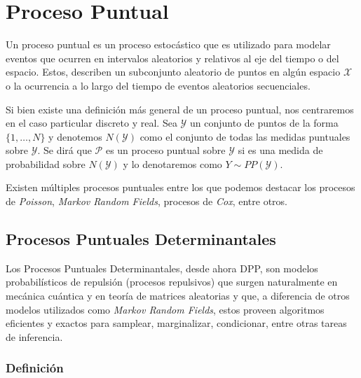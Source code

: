 \section{Proceso Puntual}

Un proceso puntual es un proceso estocástico que es utilizado para modelar eventos que ocurren en intervalos aleatorios y relativos al eje del tiempo o del espacio. Estos, describen un subconjunto aleatorio de puntos en algún espacio $\mathcal{X}$ o la ocurrencia a lo largo del tiempo de eventos aleatorios secuenciales. 

\vspace{0.2cm}

Si bien existe una definición más general de un proceso puntual, nos centraremos en el caso particular discreto y real. Sea $\mathcal{Y}$ un conjunto de puntos de la forma $\{ 1 , \dots , N \}$ y denotemos $N(\mathcal{Y})$ como el conjunto de todas las medidas puntuales sobre $\mathcal{Y}$. Se dirá que $\mathcal{P}$ es un proceso puntual sobre $\mathcal{Y}$ si es una medida de probabilidad sobre $N(\mathcal{Y})$ y lo denotaremos como $Y \sim PP(\mathcal{Y})$. 

\vspace{0.2cm}

Existen múltiples procesos puntuales entre los que podemos destacar los procesos de \textit{Poisson}, \textit{Markov Random Fields}, procesos de \textit{Cox}, entre otros. 


\subsection{Procesos Puntuales Determinantales}

Los Procesos Puntuales Determinantales, desde ahora DPP, son modelos probabilísticos de repulsión (procesos repulsivos) que surgen naturalmente en mecánica cuántica y en teoría de matrices aleatorias y que, a diferencia de otros modelos utilizados como \textit{Markov Random Fields}, estos proveen algoritmos eficientes y exactos para samplear, marginalizar, condicionar, entre otras tareas de inferencia. \cite{Kulesza_2012}


\subsubsection{Definición }

